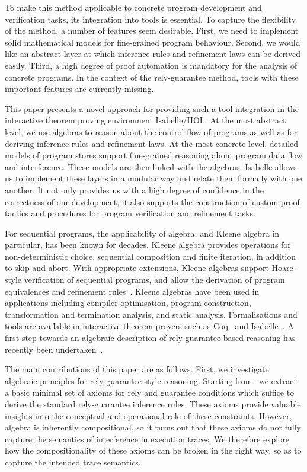 \documentclass{llncs}
\begin{document}
To make this method applicable to concrete program development and
verification tasks, its integration into tools is essential. To
capture the flexibility of the method, a number of features seem
desirable. First, we need to implement solid mathematical models for
fine-grained program behaviour. Second, we would like an abstract
layer at which inference rules and refinement laws can be derived
easily. Third, a high degree of proof automation is mandatory for the
analysis of concrete programs. In the context of the rely-guarantee
method, tools with these important features are currently missing.

This paper presents a novel approach for providing such a tool
integration in the interactive theorem proving environment
Isabelle/HOL. At the most abstract level, we use algebras to reason
about the control flow of programs as well as for deriving inference
rules and refinement laws. At the most concrete level, detailed models
of program stores support fine-grained reasoning about program data
flow and interference. These models are then linked with the
algebras. Isabelle allows us to implement these layers in a modular
way and relate them formally with one another. It not only provides us
with a high degree of confidence in the correctness of our
development, it also supports the construction of custom proof tactics
and procedures for program verification and refinement tasks.

For sequential programs, the applicability of algebra, and Kleene
algebra in particular, has been known for decades. Kleene algebra
provides operations for non-deterministic choice, sequential
composition and finite iteration, in addition to skip and abort. With
appropriate extensions, Kleene algebras support Hoare-style
verification of sequential programs, and allow the derivation of
program equivalences and refinement
rules~\cite{kozen_kleene_1997,hoare_concurrent_2011}. Kleene algebras
have been used in applications including compiler optimisation,
program construction, transformation and termination analysis, and
static analysis. Formalisations and tools are available in interactive
theorem provers such as Coq~\cite{pous_kleene_2013} and
Isabelle~\cite{armstrong_kleene_2013,armstrong_program_2013,armstrong_algebras_2014}. A
first step towards an algebraic description of rely-guarantee based
reasoning has recently been undertaken~\cite{hoare_concurrent_2011}.

The main contributions of this paper are as follows. First, we
investigate algebraic principles for rely-guarantee style
reasoning. Starting from~\cite{hoare_concurrent_2011} we extract a basic
minimal set of axioms for rely and guarantee conditions which suffice
to derive the standard rely-guarantee inference rules. These axioms
provide valuable insights into the conceptual and operational role of
these constraints. However, algebra is inherently compositional, so it
turns out that these axioms do not fully capture the semantics of
interference in execution traces. We therefore explore how the
compositionality of these axioms can be broken in the right way, so as to capture the
intended trace semantics.
\end{document}
